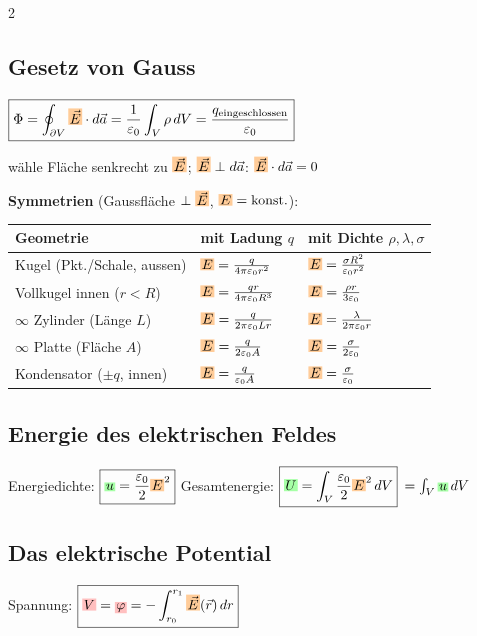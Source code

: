 \documentclass[10pt,a4paper]{article}
\newcommand{\ec}[1]{{\setlength\fboxsep{1pt}\colorbox{green!35}{\ensuremath{#1}}}}
\newcommand{\efc}[1]{{\setlength\fboxsep{1pt}\colorbox{orange!40}{\ensuremath{#1}}}}
\newcommand{\vc}[1]{{\setlength\fboxsep{1pt}\colorbox{red!25}{\ensuremath{#1}}}}
\begin{document}
\begin{multicols}{2}
\subsection{Gesetz von Gauss}

$\boxed{\Phi=\oint_{\partial V}\efc{\vec{E}}\cdot d\vec{a}=\dfrac{1}{\varepsilon_0}\int_V\rho\,dV=\dfrac{q_{\text{eingeschlossen}}}{\varepsilon_0}}$

wähle Fläche senkrecht zu $\efc{\vec{E}}$; \; $\efc{\vec{E}}\perp d\vec{a}$: $\efc{\vec{E}}\cdot d\vec{a}=0$

\textbf{Symmetrien} (Gaussfläche $\perp\efc{\vec{E}}$, $\efc{E}=\text{konst.}$):
\par
{\footnotesize\renewcommand{\arraystretch}{1.45}
\begin{tabularx}{\linewidth}{|l|X|X|}
\hline
\textbf{Geometrie} & \textbf{mit Ladung $q$} & \textbf{mit Dichte $\rho,\lambda,\sigma$} \\
\hline
Kugel (Pkt./Schale, aussen) & $\efc{E}=\tfrac{q}{4\pi\varepsilon_0 r^2}$ & $\efc{E}=\tfrac{\sigma R^2}{\varepsilon_0 r^2}$ \\
Vollkugel innen ($r<R$) & $\efc{E}=\tfrac{q r}{4\pi\varepsilon_0 R^3}$ & $\efc{E}=\tfrac{\rho r}{3\varepsilon_0}$ \\
$\infty$ Zylinder (Länge $L$) & $\efc{E}=\tfrac{q}{2\pi\varepsilon_0 L r}$ & $\efc{E}=\tfrac{\lambda}{2\pi\varepsilon_0 r}$ \\
$\infty$ Platte (Fläche $A$) & $\efc{E}=\tfrac{q}{2\varepsilon_0 A}$ & $\efc{E}=\tfrac{\sigma}{2\varepsilon_0}$ \\
Kondensator ($\pm q$, innen) & $\efc{E}=\tfrac{q}{\varepsilon_0 A}$ & $\efc{E}=\tfrac{\sigma}{\varepsilon_0}$ \\
\hline
\end{tabularx}}

\subsection{Energie des elektrischen Feldes}

Energiedichte: $\boxed{\ec{u}=\dfrac{\varepsilon_0}{2}\efc{E}^2}$ \quad Gesamtenergie: $\boxed{\ec{U}=\int_V\dfrac{\varepsilon_0}{2}\efc{E}^2\,dV}$ $=\int_V \ec{u}\,dV$

\subsection{Das elektrische Potential}

Spannung: $\boxed{\vc{V}=\vc{\varphi}=-\int_{r_0}^{r_1}\efc{\vec{E}}(\vec{r})\,dr}$


\end{multicols}
\end{document}
